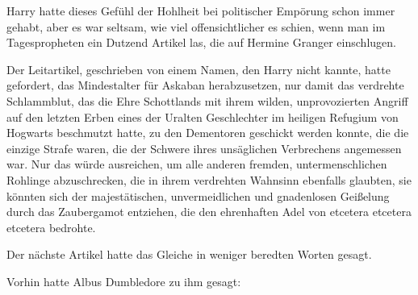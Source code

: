 Harry hatte dieses Gefühl der Hohlheit bei politischer Empörung schon immer gehabt, aber es war seltsam, wie viel offensichtlicher es schien, wenn man im Tagespropheten ein Dutzend Artikel las, die auf Hermine Granger einschlugen.

Der Leitartikel, geschrieben von einem Namen, den Harry nicht kannte, hatte gefordert, das Mindestalter für Askaban herabzusetzen, nur damit das verdrehte Schlammblut, das die Ehre Schottlands mit ihrem wilden, unprovozierten Angriff auf den letzten Erben eines der Uralten Geschlechter im heiligen Refugium von Hogwarts beschmutzt hatte, zu den Dementoren geschickt werden konnte, die die einzige Strafe waren, die der Schwere ihres unsäglichen Verbrechens angemessen war. Nur das würde ausreichen, um alle anderen fremden, untermenschlichen Rohlinge abzuschrecken, die in ihrem verdrehten Wahnsinn ebenfalls glaubten, sie könnten sich der majestätischen, unvermeidlichen und gnadenlosen Geißelung durch das Zaubergamot entziehen, die den ehrenhaften Adel von etcetera etcetera etcetera bedrohte.

Der nächste Artikel hatte das Gleiche in weniger beredten Worten gesagt.

Vorhin hatte Albus Dumbledore zu ihm gesagt:

